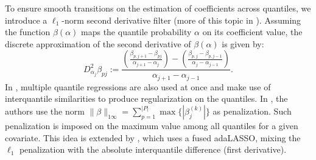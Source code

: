 To ensure smooth transitions on the estimation of coefficients across quantiles, we introduce a $\ell_1$-norm second derivative filter (more of this topic in \cite{kim2009ell_1}). Assuming the function $\beta(\alpha)$ maps the quantile probability $\alpha$ on its coefficient value, the discrete approximation of the second derivative of $\beta(\alpha)$ is given by:
\begin{equation}
D_{\alpha_j}^{2} \beta_{pj} := \frac{\left(\frac{\beta_{p,j+1}-\beta_{pj}}{\alpha_{j+1}-\alpha_{j}}\right)-\left(\frac{\beta_{p,j}-\beta_{p,j-1}}{\alpha_{j}-\alpha_{j-1}}\right)}{\alpha_{j+1}-\alpha_{j-1}}. 
\end{equation}
In \cite{zou_regularized_2008, jiang_interquantile_2014}, multiple quantile regressions are also used at once and make use of interquantile similarities to produce regularization on the quantiles. In \cite{zou_regularized_2008}, the authors use the norm $\| \beta \|_{1\infty}=\sum_{p=1}^{|P|} \max\{ |\beta_j^{(k)} |\}$ as penalization. Such penalization is imposed on the maximum value among all quantiles for a given covariate. This idea is extended by \cite{jiang_interquantile_2014}, which uses a fused adaLASSO, mixing the $\ell_1$ penalization with the absolute interquantile difference (first derivative).

